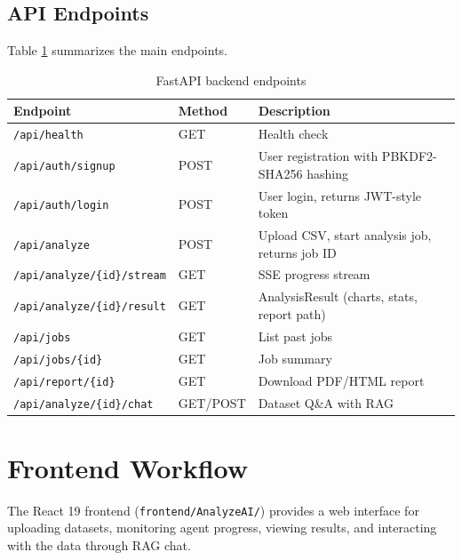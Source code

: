 \documentclass[12pt,a4paper,openany]{report}
\begin{document}
\subsection{API Endpoints}
Table \ref{tab:api-endpoints} summarizes the main endpoints.

\begin{table}[H]
\centering
\caption{FastAPI backend endpoints}
\label{tab:api-endpoints}
\begin{tabular}{p{4cm} >{\centering\arraybackslash}p{3.5cm} p{6cm}}
\hline
Endpoint & Method & Description \\
\hline
\texttt{/api/health} & GET & Health check \\
\texttt{/api/auth/signup} & POST & User registration with PBKDF2-SHA256 hashing \\
\texttt{/api/auth/login} & POST & User login, returns JWT-style token \\
\texttt{/api/analyze} & POST & Upload CSV, start analysis job, returns job ID \\
\texttt{/api/analyze/\{id\}/stream} & GET & SSE progress stream \\
\texttt{/api/analyze/\{id\}/result} & GET & AnalysisResult (charts, stats, report path) \\
\texttt{/api/jobs} & GET & List past jobs \\
\texttt{/api/jobs/\{id\}} & GET & Job summary \\
\texttt{/api/report/\{id\}} & GET & Download PDF/HTML report \\
\texttt{/api/analyze/\{id\}/chat} & GET/POST & Dataset Q\&A with RAG \\
\hline
\end{tabular}
\end{table}

\section{Frontend Workflow}
The React 19 frontend (\texttt{frontend/AnalyzeAI/}) provides a web interface for uploading datasets, monitoring agent progress, viewing results, and interacting with the data through RAG chat.
\end{document}
